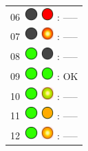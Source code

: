 \documentclass[12pt, a4paper]{report}
\begin{document}
\begin{minipage}{0.6\textwidth}
\begin{Large}
\begin{tabular}{l}
		06\  \includegraphics*[width=5mm]{off_led} \includegraphics*[width=5mm]{red_led} : -----\\
		
		07\  \includegraphics*[width=5mm]{off_led} \includegraphics*[width=5mm]{red_led_flashing} : -----\\
		
		08\  \includegraphics*[width=5mm]{green_led} \includegraphics*[width=5mm]{off_led} : -----\\
		
		09\  \includegraphics*[width=5mm]{green_led} \includegraphics*[width=5mm]{green_led} : OK\\
		
		10\  \includegraphics*[width=5mm]{green_led} \includegraphics*[width=5mm]{green_led_flashing} : -----\\
		
		11\  \includegraphics*[width=5mm]{green_led} \includegraphics*[width=5mm]{orange_led} : -----\\
		
		12\  \includegraphics*[width=5mm]{green_led} \includegraphics*[width=5mm]{orange_led_flashing} : -----\\
		

\end{tabular}
\end{Large}
\end{minipage}
\end{document}
